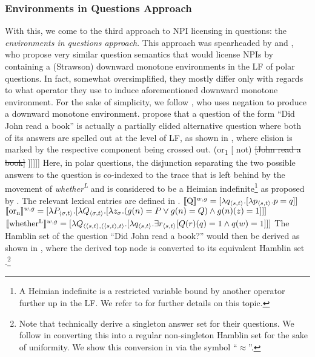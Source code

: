 \subsubsection{Environments in Questions Approach}
With this, we come to the third approach to NPI licensing in questions: the \textit{environments in questions approach}. This approach was spearheaded by \textcite{Guerzoni2014-enviro} and \textcite{Nicolae2013}, who propose very similar question semantics that would license NPIs by containing a (Strawson) downward monotone environments in the LF of polar questions. In fact, somewhat oversimplified, they mostly differ only with regards to what operator they use to induce aforementioned downward monotone environment. For the sake of simplicity, we follow \textcite{Guerzoni2014-enviro}, who uses negation to produce a downward monotone environment. \textcite{Guerzoni2014-enviro} propose that a question of the form \enquote{Did John read a book} is actually a partially elided alternative question where both of its answers are spelled out at the level of LF, as shown in , where elision is marked by the respective component being crossed out.
\ex
[] [whether\textsuperscript{L} [ 1 [ Q [ [John read a book] (or\textsubscript{1} [ not) \sout{[John read a book]} ]\hspace{0.5mm}]\hspace{0.5mm}]\hspace{0.5mm}]\hspace{0.5mm}]
\xe
Here, in polar questions, the disjunction separating the two possible answers to the question is co-indexed to the trace that is left behind by the movement of \textit{whether\textsuperscript{L}} and is considered to be a Heimian indefinite\footnote{A Heimian indefinite is a restricted variable bound by another operator further up in the LF. We refer to \textcite{Heim1982} for further details on this topic.} as proposed by \textcite{Rooth1982}. The relevant lexical entries are defined in .
\pex\label{ex:gs-definitions}
\a $\intension[w,g]{Q}=[\lambda{q_{\langle s,t\rangle}}.[\lambda{p_{\langle s,t\rangle}}.p=q]]$
\a $\intension[w,g]{or\textsubscript{n}}=[\lambda{P_{\langle\sigma,t\rangle}}.[\lambda{Q_{\langle\sigma,t\rangle}}.[\lambda{z_{\sigma}}.(g(n)=P\lor g(n)=Q)\land g(n)(z)=1]]]$
\a $\intension[w,g]{whether\textsuperscript{L}}=[\lambda{Q_{\langle\langle s,t\rangle,\langle\langle s,t\rangle,t\rangle}}.[\lambda{q_{\langle s,t\rangle}}.\exists{r_{\langle s,t\rangle}[Q(r)(q)=1\land q(w)=1]}]]$
\xe
The Hamblin set of the question \enquote{Did John read a book?} would then be derived as shown in , where the derived top node is converted to its equivalent Hamblin set \parencite[cf.][p.~206,~Footnote~7]{Guerzoni2014-enviro}.\footnote{Note that \textcite{Guerzoni2014-enviro} technically derive a singleton answer set for their questions. We follow \textcite{Crnic2014-nm} in converting this into a regular non-singleton Hamblin set for the sake of uniformity. We show this conversion in  via the symbol \enquote{$\approx$}.}
